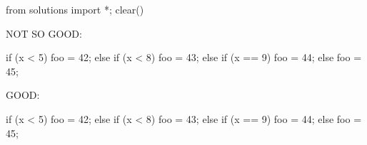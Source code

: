 \begin{python0}
from solutions import *; clear()
\end{python0}

NOT SO GOOD:\\
\begin{console}
if (x < 5)
{
    foo = 42;
}
else
{
     if (x < 8)
     {
         foo = 43;
     }
     else
     {
         if (x == 9)
         {
             foo = 44;
         }
         else
         {
             foo = 45;
         }
     }
}
\end{console}
GOOD:\\
\begin{console}
if (x < 5)
{
    foo = 42;
}
else if (x < 8)
{
    foo = 43;
}
else if (x == 9)
{
    foo = 44;
}
else
{
    foo = 45;
}
\end{console}


